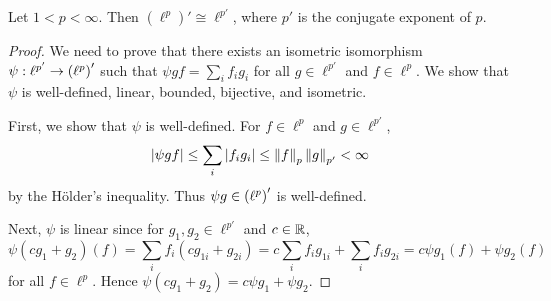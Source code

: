 \begin{theorem}
    Let $1< p < \infty$. Then $(\ell^p)' \cong \ell^{p'}$, where 
    $p'$ is the conjugate exponent of $p$.
\end{theorem}
\begin{proof}
    We need to prove that there exists an isometric isomorphism 
    $\psi:\ell^{p'}\to\pth{\ell^{p}}'$ such that $\psi gf = \sum_i f_ig_i$ 
    for all $g\in\ell^{p'}$ and $f\in\ell^p$. We show that $\psi$ 
    is well-defined, linear, bounded, bijective, and isometric. 

    First, we show that $\psi$ is well-defined. For $f\in\ell^p$ and 
    $g\in\ell^{p'}$, 
    \begin{equation*}
        \left\lvert {\psi gf} \right\rvert \leq \sum_i \left\lvert {f_ig_i} \right\rvert \leq \left\lVert {f} \right\rVert_p\left\lVert {g} \right\rVert_{p'} < \infty
    \end{equation*}
    by the H\"older's inequality. Thus $\psi g\in\pth{\ell^{p}}'$ is 
    well-defined. 

    Next, $\psi$ is linear since for $g_1,g_2\in\ell^{p'}$ and $c\in\mathbb{R}$, 
    \begin{equation*}
        \psi(cg_1 + g_2)(f) = \sum_i f_i(cg_{1i}+g_{2i}) = c\sum_i f_ig_{1i} + \sum_i f_ig_{2i} = c\psi g_1(f) + \psi g_2(f)
    \end{equation*}
    for all $f\in\ell^p$. Hence $\psi(cg_1 + g_2) = c\psi g_1 + \psi g_2$. 


\end{proof}
